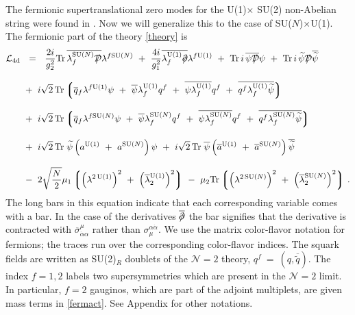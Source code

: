 \documentclass[12pt]{article}
\def\Tr{{\rm Tr}}
\newcommand{\ntwo}{${\mathcal N}=2$ }
\newcommand{\p}{\partial}
\newcommand{\wt}{\widetilde}
\newcommand{\ov}{\overline}
\newcommand{\mc}[1]{\mathcal{#1}}
\newcommand{\md}{\mathcal{D}}
\newcommand{\lgr}{\left\lgroup}
\newcommand{\rgr}{\right\rgroup}
\def\slashed#1{\setbox0=\hbox{$#1$}             %
   \dimen0=\wd0                                 %
   \setbox1=\hbox{/} \dimen1=\wd1               %
   \ifdim\dimen0>\dimen1                        %
      \rlap{\hbox to \dimen0{\hfil/\hfil}}      %
      #1                                        %
   \else                                        %
      \rlap{\hbox to \dimen1{\hfil$#1$\hfil}}   %
      /                                         %
   \fi}                                        %
\newcommand{\aU}{a^{\rm U(1)}}
\newcommand{\aN}{a^\text{SU($N$)}}
\newcommand{\baU}{\ov{a}{}^{\rm U(1)}}
\newcommand{\baN}{\ov{a}{}^\text{SU($N$)}}
\newcommand{\lU}{\lambda^{\rm U(1)}}
\newcommand{\lN}{\lambda^\text{SU($N$)}}
\begin{document}
	The fermionic supertranslational zero modes 
for the U(1)$ \times $ SU(2) non-Abelian string were found in \cite{SYhet}.
	Now we will generalize this to the case of SU($N$)$\times$U(1).
	The fermionic part of the theory \eqref{theory} is
\begin{align}
%
\notag
\mc{L}_{\rm 4d} & ~~=~~ \frac{2i}{g_2^2} \Tr\, \ov{\lN_f \slashed{\md}} \lambda^{f\text{SU($N$)}}
		~+~ \frac{4i}{g_1^2} \ov{\lU_f \slashed{\p}} \lambda^{f{\rm U(1)}}
		~+~ \Tr\, i\, \ov{\psi \slashed{\md}} \psi  
		~+~ \Tr\, i\, \wt{\psi} \slashed{\md} \ov{\wt{\psi}}
		\\[3mm]
%
\notag
		& 
		~+~
		i\sqrt{2}\, \Tr \lgr \ov{q}{}_f \lambda^{f{\rm U(1)}}\psi 
				  ~+~ \ov{\psi} \lU_f q^f  
				  ~+~ \ov{\psi \lU_f} q^f
				  ~+~ \ov{q^f \lU_f \wt{\psi}} 
				\rgr
		\\[3mm]
%
\label{fermact}
		&
		~+~
		i\sqrt{2}\, \Tr \lgr \ov{q}{}_f \lambda^{f\text{SU($N$)}} \psi 
					~+~ \ov{\psi} \lN_f q^f
					~+~ \ov{\psi \lN_f} q^f
					~+~ \ov{q^f \lN_f \wt{\psi}}
				\rgr
		\\[3mm]
%
\notag
		&
		~+~
		i\sqrt{2}\, \Tr\; \wt{\psi} \left( \aU ~+~ \aN \right) \psi  
		~+~ 
		i\sqrt{2}\, \Tr\; \ov{\psi} \left( \baU ~+~ \baN \right) \ov{\wt{\psi}}
		\\[3mm]
%
\notag
		&
		~-~
		2 \sqrt{\frac{N}{2}} \mu_1 \lgr \left( \lambda^{2\,{\rm U(1)}} \right)^2 
  					    ~+~ \left( \ov{\lambda}{}^{\rm U(1)}_2 \right)^2 \rgr
		~-~
		\mu_2 \Tr \lgr \left( \lambda^{2\,\text{SU($N$)}} \right)^2
			   ~+~ \left( \ov{\lambda}{}^\text{SU($N$)}_2 \right)^2 \rgr\,.
\end{align}
	The long bars in this equation indicate that each corresponding variable comes with a bar. 
	In the case of the derivatives $\overline{\slashed{\partial}}$ the bar signifies that 
	the derivative is contracted with $\overline{\sigma}{}^\mu_{\dot{\alpha}\alpha} $ rather 
	than $\sigma_\mu^{\alpha\dot{\alpha}}$.
	We use the matrix color-flavor notation for fermions; the traces run
	over the corresponding color-flavor indices.
	The squark fields are written as SU(2)$_R$ doublets of the \ntwo theory,
	$ q^f ~=~ (q, \ov{\wt{q}}) $. 
	The index $ f = 1, 2 $ labels two supersymmetries which are present in the \ntwo limit. 
	In particular, $ f = 2 $ gauginos, which are part of the adjoint multiplets, are given mass terms in \eqref{fermact}.
	See Appendix  for other notations.
	
\end{document}

